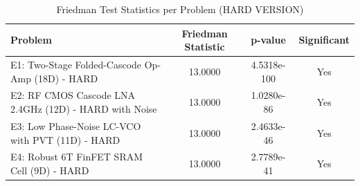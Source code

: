 \begin{table}[htbp]
\centering
\caption{Friedman Test Statistics per Problem (HARD VERSION)}
\label{tab:friedman_stats}
\small
\begin{tabular}{lccc}
\toprule
\textbf{Problem} & \textbf{Friedman Statistic} & \textbf{p-value} & \textbf{Significant} \\
\midrule
E1: Two-Stage Folded-Cascode Op-Amp (18D) - HARD & 13.0000 & 4.5318e-100 & Yes \\
E2: RF CMOS Cascode LNA 2.4GHz (12D) - HARD with Noise & 13.0000 & 1.0280e-86 & Yes \\
E3: Low Phase-Noise LC-VCO with PVT (11D) - HARD & 13.0000 & 2.4633e-46 & Yes \\
E4: Robust 6T FinFET SRAM Cell (9D) - HARD & 13.0000 & 2.7789e-41 & Yes \\
\bottomrule
\end{tabular}
\end{table}

